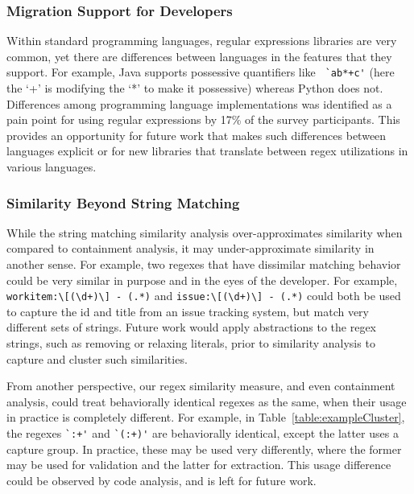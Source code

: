 \subsubsection{Migration  Support for Developers}
Within standard programming languages, regular expressions libraries are very common, yet there are  differences between languages in the features that they support. For example, Java supports possessive quantifiers like \verb! `ab*+c'! (here the `+' is modifying the `*' to make it possessive) whereas Python does not. Differences among programming language implementations was identified as a pain point for using regular expressions by 17\% of the survey participants. This provides an opportunity for future work that makes such differences between languages explicit or for new libraries that translate between regex utilizations in various languages.


\subsubsection{Similarity Beyond String Matching}
While the string matching similarity analysis over-approximates similarity when compared to containment analysis, it may under-approximate similarity in another sense. 
For example, two regexes that have dissimilar matching behavior could be very similar in purpose and in the eyes of the developer. For example, \verb!workitem:\[(\d+)\] - (.*)! and \verb!issue:\[(\d+)\] - (.*)! could both be used to  capture the id and title from an issue tracking system, but match very different sets of strings. Future work would apply abstractions to the regex strings, such as removing or relaxing literals, prior to similarity analysis to capture and cluster such similarities.

From another perspective, our regex similarity measure, and even containment analysis, could treat behaviorally identical regexes as the same, when  their usage in practice is completely different. For example, in Table~\ref{table:exampleCluster}, the regexes \verb!`:+'! and \verb!`(:+)'! are behaviorally identical, except the latter uses a capture group. In practice, these may be used very differently, where the former may be used for validation and the latter for extraction. This usage difference could be observed by code  analysis, and is left for future work. 


